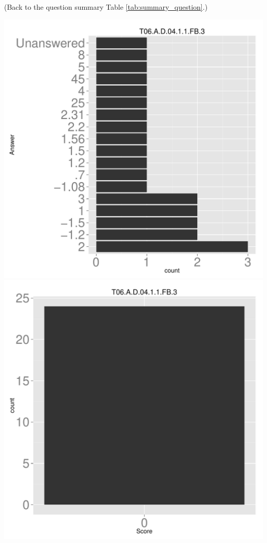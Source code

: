 \documentclass[12pt,nohyper]{tufte-handout}\usepackage[]{graphicx}\usepackage[]{color}
\begin{document}
 (Back to the question summary Table \ref{tab:summary_question}.)

\begin{center} \includegraphics[width=.45\linewidth]{Topic06_15_answer} \includegraphics[width=.45\linewidth]{Topic06_15_score} \end{center} 
\end{document}
